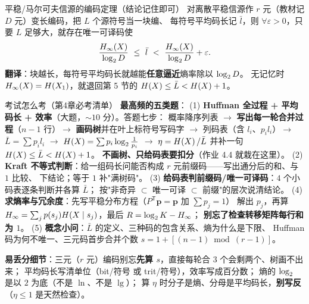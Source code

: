 \begin{defbox}{平稳/马尔可夫信源的编码定理（结论记住即可）}
对离散平稳信源作 $r$ 元（教材记 $D$ 元）变长编码，把 $L$ 个源符号当一块编、
每符号平均码长记 $\bar l$，则 $\forall\varepsilon>0$，只要 $L$ 足够大，就存在唯一可译码使
\begin{align*}
\frac{H_\infty(X)}{\log_{2} D}\ \le\ \bar l\ <\ \frac{H_\infty(X)}{\log_{2} D}+\varepsilon .
\end{align*}
\textbf{翻译}：块越长，每符号平均码长就越能\textbf{任意逼近}熵率除以 $\log_{2} D$。
无记忆时 $H_\infty(X)=H\!\left(X_1\right)$，就退回第 5 节的 $H\!\left(X\right)\le\bar L<H\!\left(X\right)+1$。
\end{defbox}

\begin{exam}{考试怎么考（第4章必考清单）}
\textbf{最高频的五类题}：
(1) \textbf{Huffman 全过程 + 平均码长 + 效率}（大题，$\sim10$ 分）。答题七步：
概率降序列表 $\to$ \textbf{写出每一轮合并过程}（$n-1$ 行）$\to$ \textbf{画码树}并在叶上标符号写码字
$\to$ 列码表（含 $l_i$、$p_il_i$）$\to$ $\bar L=\sum p_il_i$ $\to$ $H\!\left(X\right)=\sum p_i\log_{2}\frac1{p_i}$
$\to$ $\eta=H\!\left(X\right)/\bar L$ 并补一句 $H\!\left(X\right)\le\bar L<H\!\left(X\right)+1$。
\textbf{不画树、只给码表要扣分}（作业 4.4 就栽在这里）。
(2) \textbf{Kraft 不等式判断}：给一组码长问能否构成 $r$ 元前缀码——写出通分后的和、与 $1$ 比较、
下结论；等于 $1$ 补"满树码"。
(3) \textbf{给码表判前缀码/唯一可译码}：$4$ 个小码表逐条判断并各算 $\bar L$；
按"非奇异 $\subset$ 唯一可译 $\subset$ 前缀"的层次说清结论。
(4) \textbf{求熵率与冗余度}：先写平稳分布方程（$P^{\mathsf T}\boldsymbol p=\boldsymbol p$ 加 $\sum p_j=1$）
解出 $p_j$，再算 $H_\infty=\sum_jp(s_j)H\!\left(X\mid s_j\right)$，最后 $R=\log_{2} K-H_\infty$；
\textbf{别忘了检查转移矩阵每行和为 $1$}。
(5) \textbf{概念小问}：$\bar L$ 的定义、三种码的包含关系、熵为什么是下限、
Huffman 码为何不唯一、三元码首步合并个数 $s=1+[(n-1)\bmod(r-1)]$。

\textbf{易丢分细节}：三元（$r$ 元）编码别忘\textbf{先算 $s$}，直接每轮合 $3$ 个会剩两个、树画不出来；
平均码长写清单位（bit/符号 或 trit/符号），效率写成百分数；
熵的 $\log_{2}$ 是以 $2$ 为底（不是 $\ln$、不是 $\lg$）；
算 $\eta$ 时分子是熵、分母是平均码长，\textbf{别写反}（$\eta\le1$ 是天然检查）。
\end{exam}

